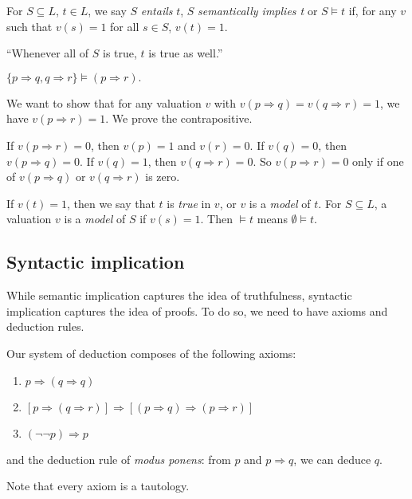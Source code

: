 \documentclass[a4paper]{article}
\begin{document}
\begin{defi}
  For $S\subseteq L$, $t\in L$, we say $S$ \emph{entails} $t$, $S$ \emph{semantically implies t} or $S\models t$ if, for any $v$ such that $v(s) = 1$ for all $s\in S$, $v(t) = 1$.

  ``Whenever all of $S$ is true, $t$ is true as well.''
\end{defi}

\begin{eg}
  $\{p\Rightarrow q, q\Rightarrow r\}\models (p\Rightarrow r).$

  We want to show that for any valuation $v$ with $v(p\Rightarrow q) = v(q\Rightarrow r) = 1$, we have $v(p\Rightarrow r) = 1$. We prove the contrapositive.

  If $v(p\Rightarrow r) = 0$, then $v(p) = 1$ and $v(r) = 0$. If $v(q) = 0$, then $v(p\Rightarrow q) = 0$. If $v(q) = 1$, then $v(q\Rightarrow r) = 0$. So $v(p\Rightarrow r) = 0$ only if one of $v(p\Rightarrow q)$ or $v(q\Rightarrow r)$ is zero. 
\end{eg}
\begin{defi}
  If $v(t) = 1$, then we say that $t$ is \emph{true} in $v$, or $v$ is a \emph{model} of $t$. For $S\subseteq L$, a valuation $v$ is a \emph{model} of $S$ if $v(s) = 1$. Then $\models t$ means $\emptyset \models t$. 
\end{defi}
\subsection{Syntactic implication}
While semantic implication captures the idea of truthfulness, syntactic implication captures the idea of proofs. To do so, we need to have axioms and deduction rules.

Our system of deduction composes of the following axioms:
\begin{enumerate}
  \item $p\Rightarrow(q\Rightarrow q)$
  \item $[p\Rightarrow(q\Rightarrow r)]\Rightarrow[(p\Rightarrow q)\Rightarrow(p \Rightarrow r)]$
  \item $(\neg\neg p)\Rightarrow p$
\end{enumerate}
and the deduction rule of \emph{modus ponens}: from $p$ and $p\Rightarrow q$, we can deduce $q$.

Note that every axiom is a tautology. 
\end{document}
